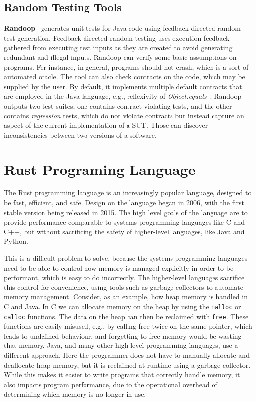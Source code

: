 \documentclass[paper=a4,%
  twoside,%
  BCOR4mm,%
  abstract=true,%
  toc=bibliography,%
  chapterprefix=true,%
  toc=bibliographynumbered,%
  open=right,%
  english,%
  pagesize=pdftex]{scrreprt}
\begin{document}
\section{Random Testing Tools}
\textbf{Randoop}~\cite{Pacheco_2007} generates unit tests for Java code using feedback-directed random test generation. Feedback-directed random testing uses execution feedback gathered from executing test inputs as they are created to avoid generating redundant and illegal inputs. Randoop can verify some basic assumptions on programs. For instance, in general, programs should not crash, which is a sort of automated oracle. The tool can also check  contracts on the code, which may be supplied by the user. By default, it implements multiple default contracts that are employed in the Java language, e.g., reflexivity of \textit{Object.equals}~\cite{Fraser2013}. Randoop outputs two test suites; one contains contract-violating tests, and the other contains \textit{regression} tests, which do not violate contracts but instead capture an aspect of the current implementation of a \ac{SUT}. Those can discover inconsistencies between two versions of a software.


\clearpage
\chapter{Rust Programing Language}
\label{chap:rust-programming-language}
The Rust programming language is an increasingly popular language, designed to be fast, efficient, and safe. Design on the language began in 2006, with the first stable version being released in 2015. The high level goals of the language are to provide performance comparable to systems programming languages like C and C++, but without sacrificing the safety of higher-level languages, like Java and Python.

This is a difficult problem to solve, because the systems programming languages need to be able to control how memory is managed explicitly in order to be performant, which is easy to do incorrectly. The higher-level languages sacrifice this control for convenience, using tools such as garbage collectors to automate memory management.
Consider, as an example, how heap memory is handled in C and Java. In C we can allocate memory on the heap by using the \lstinline{malloc} or \lstinline{calloc} functions. The data on the heap can then be reclaimed with \lstinline{free}. These functions are easily misused, e.g., by calling free twice on the same pointer, which leads to undefined behaviour, and forgetting to free memory would be wasting that memory. Java, and many other high level programming languages, use a different approach. Here the programmer does not have to manually allocate and deallocate heap memory, but it is reclaimed at runtime using a garbage collector. While this makes it easier to write programs that correctly handle memory, it also impacts program performance, due to the operational overhead of determining which memory is no longer in use.
\end{document}
